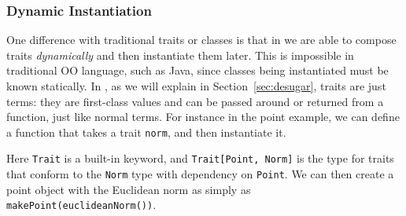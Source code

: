 
\subsubsection{Dynamic Instantiation}

One difference with traditional traits or classes is that in \name we are able
to compose traits \textit{dynamically} and then instantiate them later. This is
impossible in traditional OO language, such as Java, since classes being
instantiated must be known statically. In \name, as we will explain in
Section~\ref{sec:desugar}, traits are just terms: they are first-class values
and can be passed around or returned from a function, just like normal terms.
For instance in the point example, we can define a function that takes a trait
\lstinline$norm$, and then instantiate it.


Here \lstinline{Trait} is a built-in keyword, and \lstinline$Trait[Point, Norm]$
is the type for traits that conform to the \lstinline$Norm$ type with dependency
on \lstinline$Point$. We can then create a point object with the Euclidean norm
as simply as \lstinline$makePoint(euclideanNorm())$.
